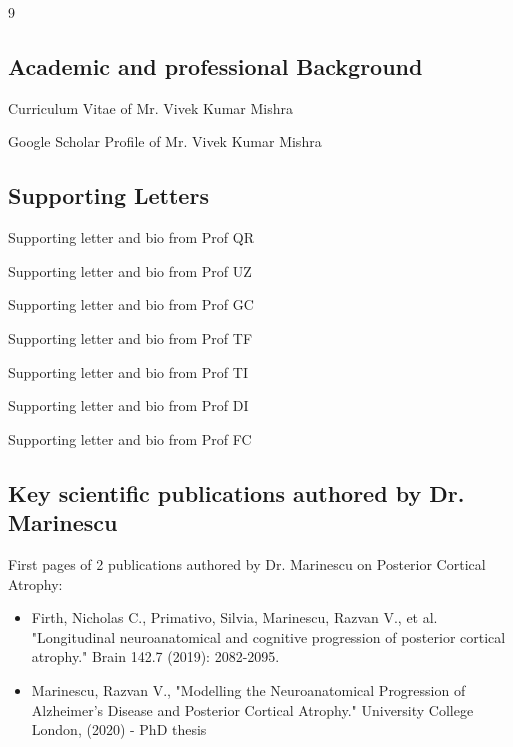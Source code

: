 \documentclass[11pt]{article}
\begin{document}
\begin{thebibliography}{9}

\subsection*{Academic and professional Background}

Curriculum Vitae of Mr. Vivek Kumar Mishra


Google Scholar Profile of Mr. Vivek Kumar Mishra 


\subsection*{Supporting Letters}

Supporting letter and bio from Prof QR

Supporting letter and bio from Prof UZ

Supporting letter and bio from Prof GC

Supporting letter and bio from Prof TF

Supporting letter and bio from Prof TI

Supporting letter and bio from Prof DI

Supporting letter and bio from Prof FC

\subsection*{Key scientific publications authored by Dr. Marinescu}



First pages of 2 publications authored by Dr. Marinescu on Posterior Cortical Atrophy:
\begin{itemize}
 \item Firth, Nicholas C., Primativo, Silvia, Marinescu, Razvan V., et al. "Longitudinal neuroanatomical and cognitive progression of posterior cortical atrophy." Brain 142.7 (2019): 2082-2095.
 \item Marinescu, Razvan V., "Modelling the Neuroanatomical Progression of Alzheimer's Disease and Posterior Cortical Atrophy." University College London, (2020) - PhD thesis
\end{itemize}





\end{thebibliography}
\end{document}
